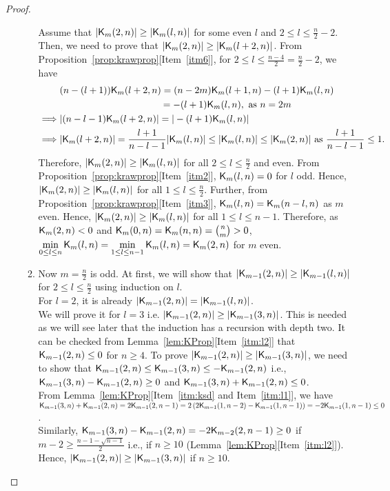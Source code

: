 \documentclass{llncs}
\begin{document}
\begin{proof}
\begin{enumerate}
\begin{enumerate}
Assume that $|\mathsf{K}_{m}(2,n)| \geq |\mathsf{K}_{m}(l,n)|$ for some even $l$ and $2 \leq l \leq \frac{n}{2}-2$. Then, we need to prove that $|\mathsf{K}_{m}(2,n)| \geq |\mathsf{K}_{m}(l+2,n)|$.
From Proposition~\ref{prop:krawprop}[Item~\ref{itm6}], for $2 \leq l \leq \frac{n-4}{2} = \frac{n}{2}-2$, we have
\begin{align*}
& (n-(l+1)) \mathsf{K}_{m}(l+2,n) = (n-2m) \mathsf{K}_{m}(l+1,n) - (l+1)\mathsf{K}_{m}(l,n) \\
& ~~~~~~~~~~~~~~~~~~~~~~~~~~~~~~~~=  - (l+1)\mathsf{K}_{m}(l,n), \mbox{ as } n = 2m \\
\implies & |(n-l-1) \mathsf{K}_{m}(l+2,n)| = |-(l+1) \mathsf{K}_{m}(l,n)| \\
\implies & |\mathsf{K}_{m}(l+2,n)| = \frac{l+1}{n-l-1} |\mathsf{K}_{m}(l,n)|  \leq |\mathsf{K}_{m}(l,n)| \leq |\mathsf{K}_{m}(2,n)| \text{ as } \frac{l+1}{n-l-1} \leq 1.
\end{align*}
Therefore, $|\mathsf{K}_{m}(2,n)| \geq |\mathsf{K}_{m}(l,n)|$ for all $2 \leq l \leq \frac{n}{2}$ and even. From Proposition~\ref{prop:krawprop}[Item~\ref{itm2}], $\mathsf{K}_{m}(l,n) = 0$ for $l$ odd. Hence, $|\mathsf{K}_{m}(2,n)| \geq |\mathsf{K}_{m}(l,n)|$ for all $1 \leq l \leq \frac{n}{2}$. Further, from Proposition~\ref{prop:krawprop}[Item~\ref{itm3}], $\mathsf{K}_{m}(l,n) = \mathsf{K}_{m}(n-l,n)$ as $m$ even. Hence, $|\mathsf{K}_{m}(2,n)| \geq |\mathsf{K}_{m}(l,n)|$ for all $1 \leq l \leq n-1$.
Therefore, as $\mathsf{K}_{m}(2,n) < 0$ and $\mathsf{K}_{m}(0,n) = \mathsf{K}_{m}(n,n) = {n \choose m} > 0$, $\min\limits_{0 \leq l \leq n }\mathsf{K}_{m}(l,n)= \min\limits_{1 \leq l \leq n-1}\mathsf{K}_{m}(l,n) = \mathsf{K}_{m}(2,n)$ for $m$ even.

\item Now $m = \frac{n}{2}$ is odd.
At first, we will show that $|\mathsf{K}_{m-1}(2,n)| \geq |\mathsf{K}_{m-1}(l,n)|$ for $2 \leq l \leq \frac{n}{2}$ using induction on $l$.\\
For $l = 2$, it is already $|\mathsf{K}_{m-1}(2,n)| = |\mathsf{K}_{m-1}(l,n)|$.\\
We will prove it for $l = 3$ i.e. $|\mathsf{K}_{m-1}(2,n)| \geq |\mathsf{K}_{m-1}(3,n)|$. This is needed as we will see later that the induction has a recursion with depth two.
It can be checked from Lemma~\ref{lem:KProp}[Item~\ref{itm:l2}] that $\mathsf{K}_{m-1}(2,n) \leq 0$ for  $n \geq 4$. To prove $|\mathsf{K}_{m-1}(2,n)| \geq |\mathsf{K}_{m-1}(3,n)|$, we need to show that $\mathsf{K}_{m-1}(2,n) \leq \mathsf{K}_{m-1}(3,n) \leq -\mathsf{K}_{m-1}(2,n)$ i.e., $\mathsf{K}_{m-1}(3,n)-\mathsf{K}_{m-1}(2,n) \geq 0$ and 
$\mathsf{K}_{m-1}(3,n)+\mathsf{K}_{m-1}(2,n) \leq 0$.\\
From Lemma~\ref{lem:KProp}[Item~\ref{itm:ksd} and Item~\ref{itm:l1}], we have $\mathsf{K}_{m-1}(3,n)+\mathsf{K}_{m-1}(2,n) = 2\mathsf{K}_{m-1}(2,n-1) = 
2\left( 2\mathsf{K}_{m-1}(1,n-2) - \mathsf{K}_{m-1}(1,n-1)\right) = -2\mathsf{K}_{m-1}(1,n-1)
\leq 0$.\\
Similarly, $\mathsf{K}_{m-1}(3,n)-\mathsf{K}_{m-1}(2,n) = -2\mathsf{K}_{m-2}(2,n-1) \geq 0$ if $m-2 \geq \frac{n-1-\sqrt{n-1}}{2}$ i.e., if $n \geq 10$ (Lemma~\ref{lem:KProp}[Item~\ref{itm:l2}]).
Hence, $|\mathsf{K}_{m-1}(2,n)| \geq |\mathsf{K}_{m-1}(3,n)|$ if $n \geq 10$.


\end{enumerate}
\end{enumerate}
\end{proof}
\end{document}
